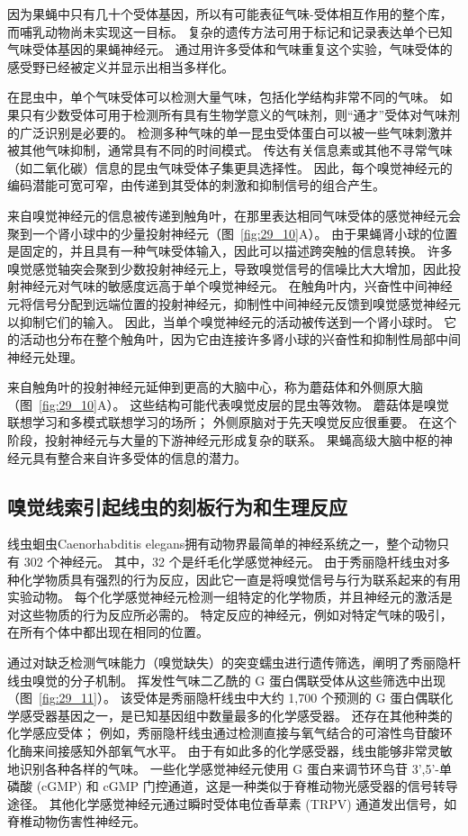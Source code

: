 因为果蝇中只有几十个受体基因，所以有可能表征气味-受体相互作用的整个库，而哺乳动物尚未实现这一目标。
复杂的遗传方法可用于标记和记录表达单个已知气味受体基因的果蝇神经元。
通过用许多受体和气味重复这个实验，气味受体的感受野已经被定义并显示出相当多样化。


在昆虫中，单个气味受体可以检测大量气味，包括化学结构非常不同的气味。
如果只有少数受体可用于检测所有具有生物学意义的气味剂，则“通才”受体对气味剂的广泛识别是必要的。
检测多种气味的单一昆虫受体蛋白可以被一些气味刺激并被其他气味抑制，通常具有不同的时间模式。
传达有关信息素或其他不寻常气味（如二氧化碳）信息的昆虫气味受体子集更具选择性。
因此，每个嗅觉神经元的编码潜能可宽可窄，由传递到其受体的刺激和抑制信号的组合产生。


来自嗅觉神经元的信息被传递到触角叶，在那里表达相同气味受体的感觉神经元会聚到一个肾小球中的少量投射神经元（图~\ref{fig:29_10}A）。
由于果蝇肾小球的位置是固定的，并且具有一种气味受体输入，因此可以描述跨突触的信息转换。
许多嗅觉感觉轴突会聚到少数投射神经元上，导致嗅觉信号的信噪比大大增加，因此投射神经元对气味的敏感度远高于单个嗅觉神经元。
在触角叶内，兴奋性中间神经元将信号分配到远端位置的投射神经元，抑制性中间神经元反馈到嗅觉感觉神经元以抑制它们的输入。
因此，当单个嗅觉神经元的活动被传送到一个肾小球时。 它的活动也分布在整个触角叶，因为它由连接许多肾小球的兴奋性和抑制性局部中间神经元处理。


来自触角叶的投射神经元延伸到更高的大脑中心，称为蘑菇体和外侧原大脑（图~\ref{fig:29_10}A）。
这些结构可能代表嗅觉皮层的昆虫等效物。 蘑菇体是嗅觉联想学习和多模式联想学习的场所；
外侧原脑对于先天嗅觉反应很重要。
在这个阶段，投射神经元与大量的下游神经元形成复杂的联系。
果蝇高级大脑中枢的神经元具有整合来自许多受体的信息的潜力。


\subsection{嗅觉线索引起线虫的刻板行为和生理反应}

线虫蛔虫Caenorhabditis elegans拥有动物界最简单的神经系统之一，整个动物只有 302 个神经元。
其中，32 个是纤毛化学感觉神经元。
由于秀丽隐杆线虫对多种化学物质具有强烈的行为反应，因此它一直是将嗅觉信号与行为联系起来的有用实验动物。
每个化学感觉神经元检测一组特定的化学物质，并且神经元的激活是对这些物质的行为反应所必需的。
特定反应的神经元，例如对特定气味的吸引，在所有个体中都出现在相同的位置。


通过对缺乏检测气味能力（嗅觉缺失）的突变蠕虫进行遗传筛选，阐明了秀丽隐杆线虫嗅觉的分子机制。
挥发性气味二乙酰的 G 蛋白偶联受体从这些筛选中出现（图~\ref{fig:29_11}）。
该受体是秀丽隐杆线虫中大约 1,700 个预测的 G 蛋白偶联化学感受器基因之一，是已知基因组中数量最多的化学感受器。
还存在其他种类的化学感应受体；
例如，秀丽隐杆线虫通过检测直接与氧气结合的可溶性鸟苷酸环化酶来间接感知外部氧气水平。
由于有如此多的化学感受器，线虫能够非常灵敏地识别各种各样的气味。
一些化学感觉神经元使用 G 蛋白来调节环鸟苷 3',5'-单磷酸 (cGMP) 和 cGMP 门控通道，这是一种类似于脊椎动物光感受器的信号转导途径。
其他化学感觉神经元通过瞬时受体电位香草素 (TRPV) 通道发出信号，如脊椎动物伤害性神经元。


